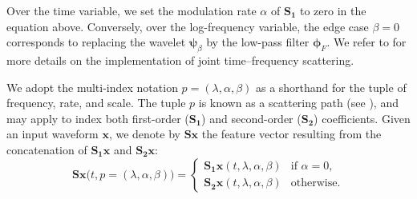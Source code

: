 \documentclass{bmcart}
\begin{document}
Over the time variable, we set the modulation rate $\alpha$ of $\mathbf{S_1}$ to zero in the equation above.
Conversely, over the log-frequency variable, the edge case $\beta=0$ corresponds to replacing the wavelet $\boldsymbol{\psi}_{\beta}$ by the low-pass filter $\boldsymbol{\phi}_F$.
We refer to \cite{anden2019tsp} for more details on the implementation of joint time--frequency scattering.

We adopt the multi-index notation $p = (\lambda, \alpha, \beta)$ as a shorthand for the tuple of frequency, rate, and scale.
The tuple $p$ is known as a scattering path (see \cite{mallat2012cpam}), and may apply to index both first-order ($\mathbf{S_1}$) and second-order ($\mathbf{S_2}$) coefficients.
Given an input waveform $\boldsymbol{x}$, we denote by $\mathbf{S}\boldsymbol{x}$ the feature vector resulting from the concatenation of $\mathbf{S_1}\boldsymbol{x}$ and $\mathbf{S_2}\boldsymbol{x}$:
\begin{equation}
\mathbf{S}\boldsymbol{x}\big(t, p=(\lambda, \alpha, \beta)\big)
=\left\{
\begin{array}{ll}
\mathbf{S_{1}}\boldsymbol{x}(t,\lambda,\alpha,\beta) & \textrm{if }\alpha=0,\\
\mathbf{S_{2}}\boldsymbol{x}(t,\lambda,\alpha,\beta) & \textrm{otherwise.}
\end{array}\right.
\end{equation}
\end{document}
